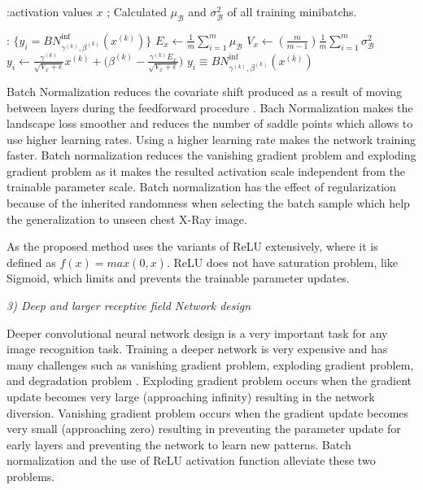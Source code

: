 \begin{algorithmic}[1]

\REQUIRE :activation values $x$ ; Calculated $\mu_{\mathcal B}$ and $\sigma^2_{\mathcal B}$ of all training minibatchs.

\ENSURE  : $\{y_i = BN^{\text{inf}}_{\gamma^{(k)},\beta^{(k)}}(x^{(k)})\}$
\vspace*{.7\baselineskip}
\STATE $E_x \leftarrow \frac1m \sum_{i = 1}^m \mu_{\mathcal B}$
\vspace*{.7\baselineskip}
\STATE $ V_x \leftarrow  (\frac{m}{m-1}) \frac1m \sum_{i=1}^m \sigma^2_{\mathcal B} $
\vspace*{.7\baselineskip}
\STATE
$y_i \leftarrow
\frac{\gamma^{(k)}}{\sqrt{V_x+\epsilon}}x^{(k)}+
\Bigg(\beta^{(k)}-\frac{\gamma^{(k)} E_x }{\sqrt{V_x + \epsilon}}\Bigg)$
\vspace*{.7\baselineskip}
\STATE
$y_i \equiv  BN^{\text{inf}}_{\gamma^{(k)},\beta^{(k)}}(x^{(k)})$
\end{algorithmic}





Batch Normalization \cite{batchnorm} reduces the covariate shift produced as a result of  moving between layers during the feedforward procedure \cite{batchnorm}. Bach Normalization makes the landscape loss smoother and reduces the number of saddle points \cite{bnopt} which allows to use higher learning rates. Using a higher learning rate makes the network training  faster\cite{batchnorm}. Batch normalization reduces the vanishing gradient problem and exploding gradient problem as it makes the resulted activation scale independent from the trainable parameter scale\cite{batchnorm}. Batch normalization has the effect of regularization because of the inherited randomness when selecting the batch sample\cite{batchnorm} which help the generalization to unseen chest X-Ray image.

As  the proposed method   uses  the variants of ReLU \cite{alexnet} extensively, where it is defined as $f(x) = max(0,x)$. ReLU does not have saturation problem, like Sigmoid, which limits and prevents the trainable parameter updates.

\textit{3) Deep and larger receptive field Network design}

Deeper convolutional neural network design is a very important task for any image recognition task\cite{resnet}. Training a deeper network is very expensive and has many challenges such as vanishing gradient problem, exploding gradient problem, and degradation problem \cite{resnet}. Exploding gradient problem occurs  when the  gradient update becomes very large (approaching infinity) resulting in the network diversion. Vanishing gradient problem occurs when the  gradient update becomes very small (approaching zero) resulting in preventing the parameter update for early layers\cite{resnet} and preventing the network to learn new patterns. Batch normalization \cite{batchnorm} and the use of ReLU activation function \cite{alexnet} alleviate these two problems.

